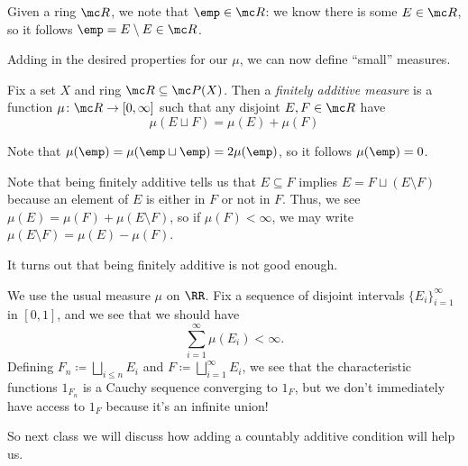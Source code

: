 \documentclass[../notes.tex]{subfiles}
\begin{document}
\begin{remark}
	Given a ring $\mc R$, we note that $\emp\in\mc R$: we know there is some $E\in\mc R$, so it follows $\emp=E\setminus E\in\mc R$.
\end{remark}
Adding in the desired properties for our $\mu$, we can now define ``small'' measures.
\begin{definition}
	Fix a set $X$ and ring $\mc R\subseteq\mc P(X)$. Then a \textit{finitely additive measure} is a function $\mu\colon\mc R\to[0,\infty]$ such that any disjoint $E,F\in\mc R$ have
	\[\mu(E\sqcup F)=\mu(E)+\mu(F)\]
\end{definition}
\begin{remark}
	Note that $\mu(\emp)=\mu(\emp\sqcup\emp)=2\mu(\emp)$, so it follows $\mu(\emp)=0$.
\end{remark}
\begin{remark} \label{rem:fin-additive-is-subtractive}
	Note that being finitely additive tells us that $E\subseteq F$ implies $E=F\sqcup(E\setminus F)$ because an element of $E$ is either in $F$ or not in $F$. Thus, we see $\mu(E)=\mu(F)+\mu(E\setminus F)$, so if $\mu(F)<\infty$, we may write $\mu(E\setminus F)=\mu(E)-\mu(F)$.
\end{remark}
It turns out that being finitely additive is not good enough.
\begin{example} \label{ex:want-countable-union}
	We use the usual measure $\mu$ on $\RR$. Fix a sequence of disjoint intervals $\{E_i\}_{i=1}^\infty$ in $[0,1]$, and we see that we should have
	\[\sum_{i=1}^\infty\mu(E_i)<\infty.\]
	Defining $F_n\coloneqq\bigsqcup_{i\le n}E_i$ and $F\coloneqq\bigsqcup_{i=1}^\infty E_i$, we see that the characteristic functions $1_{F_n}$ is a Cauchy sequence converging to $1_F$, but we don't immediately have access to $1_F$ because it's an infinite union!
\end{example}
So next class we will discuss how adding a countably additive condition will help us.
\end{document}
